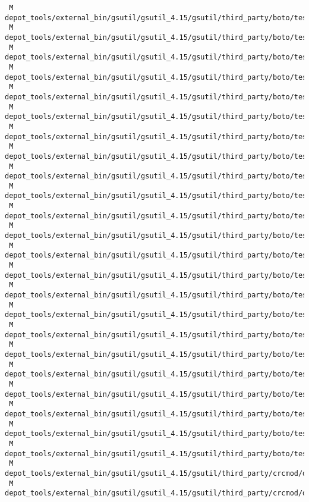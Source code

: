 \documentclass{article}
\begin{document}
\begin{verbatim}
 M depot_tools/external_bin/gsutil/gsutil_4.15/gsutil/third_party/boto/tests/unit/rds/test_connection.py
 M depot_tools/external_bin/gsutil/gsutil_4.15/gsutil/third_party/boto/tests/unit/route53/test_connection.py
 M depot_tools/external_bin/gsutil/gsutil_4.15/gsutil/third_party/boto/tests/unit/s3/test_bucket.py
 M depot_tools/external_bin/gsutil/gsutil_4.15/gsutil/third_party/boto/tests/unit/s3/test_connection.py
 M depot_tools/external_bin/gsutil/gsutil_4.15/gsutil/third_party/boto/tests/unit/s3/test_key.py
 M depot_tools/external_bin/gsutil/gsutil_4.15/gsutil/third_party/boto/tests/unit/sns/test_connection.py
 M depot_tools/external_bin/gsutil/gsutil_4.15/gsutil/third_party/boto/tests/unit/sqs/test_connection.py
 M depot_tools/external_bin/gsutil/gsutil_4.15/gsutil/third_party/boto/tests/unit/sqs/test_message.py
 M depot_tools/external_bin/gsutil/gsutil_4.15/gsutil/third_party/boto/tests/unit/swf/test_layer1_decisions.py
 M depot_tools/external_bin/gsutil/gsutil_4.15/gsutil/third_party/boto/tests/unit/swf/test_layer2_base.py
 M depot_tools/external_bin/gsutil/gsutil_4.15/gsutil/third_party/boto/tests/unit/swf/test_layer2_domain.py
 M depot_tools/external_bin/gsutil/gsutil_4.15/gsutil/third_party/boto/tests/unit/swf/test_layer2_types.py
 M depot_tools/external_bin/gsutil/gsutil_4.15/gsutil/third_party/boto/tests/unit/test_connection.py
 M depot_tools/external_bin/gsutil/gsutil_4.15/gsutil/third_party/boto/tests/unit/utils/test_utils.py
 M depot_tools/external_bin/gsutil/gsutil_4.15/gsutil/third_party/boto/tests/unit/vpc/test_customergateway.py
 M depot_tools/external_bin/gsutil/gsutil_4.15/gsutil/third_party/boto/tests/unit/vpc/test_dhcpoptions.py
 M depot_tools/external_bin/gsutil/gsutil_4.15/gsutil/third_party/boto/tests/unit/vpc/test_internetgateway.py
 M depot_tools/external_bin/gsutil/gsutil_4.15/gsutil/third_party/boto/tests/unit/vpc/test_routetable.py
 M depot_tools/external_bin/gsutil/gsutil_4.15/gsutil/third_party/boto/tests/unit/vpc/test_subnet.py
 M depot_tools/external_bin/gsutil/gsutil_4.15/gsutil/third_party/boto/tests/unit/vpc/test_vpc.py
 M depot_tools/external_bin/gsutil/gsutil_4.15/gsutil/third_party/boto/tests/unit/vpc/test_vpc_peering_connection.py
 M depot_tools/external_bin/gsutil/gsutil_4.15/gsutil/third_party/boto/tests/unit/vpc/test_vpnconnection.py
 M depot_tools/external_bin/gsutil/gsutil_4.15/gsutil/third_party/boto/tests/unit/vpc/test_vpngateway.py
 M depot_tools/external_bin/gsutil/gsutil_4.15/gsutil/third_party/crcmod/docs/source/conf.py
 M depot_tools/external_bin/gsutil/gsutil_4.15/gsutil/third_party/crcmod/docs/source/make_predefined_table.py

\end{verbatim}
\end{document}
